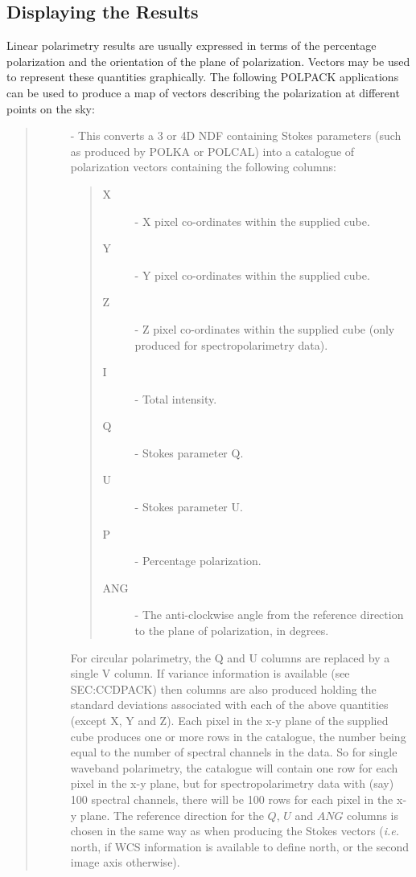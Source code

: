 \documentclass[twoside,11pt]{starlink}
\begin{document}
\subsection{\label{SEC:DISP}Displaying the Results}
Linear polarimetry results are usually expressed in terms of the
percentage polarization and the orientation of the plane of polarization.
Vectors may be used to represent these quantities graphically. The
following POLPACK applications can be used to produce a map of vectors
describing the polarization at different points on the sky:

\begin{quote}
\begin{description}
\item [] - This converts a 3 or 4D NDF containing
Stokes parameters (such as produced by POLKA or POLCAL) into a catalogue
of polarization vectors containing the following columns:

\begin{quote}
\begin{description}
\item [X] - X pixel co-ordinates within the supplied cube.
\item [Y] - Y pixel co-ordinates within the supplied cube.
\item [Z] - Z pixel co-ordinates within the supplied cube (only produced
            for spectropolarimetry data).
\item [I] - Total intensity.
\item [Q] - Stokes parameter Q.
\item [U] - Stokes parameter U.
\item [P] - Percentage polarization.
\item [ANG] - The anti-clockwise angle from the reference direction to
the plane of polarization, in degrees.
\end{description}
\end{quote}

For circular polarimetry, the Q and U columns are replaced by a single V
column. If variance information is available (see  {}{SEC:CCDPACK}) then columns are also produced holding the standard
deviations associated with each of the above quantities (except X, Y and
Z). Each pixel in the x-y plane of the supplied cube produces one or more
rows in the catalogue, the number being equal to the number of spectral
channels in the data. So for single waveband polarimetry, the catalogue
will contain one row for each pixel in the x-y plane, but for
spectropolarimetry data with (say) 100 spectral channels, there will be
100 rows for each pixel in the x-y plane. The reference direction for the
$Q$, $U$ and $ANG$ columns is chosen in the same way as when producing
the Stokes vectors (\emph{i.e.} north, if WCS information is available to
define north, or the second image axis otherwise).


\end{description}
\end{quote}
\end{document}
